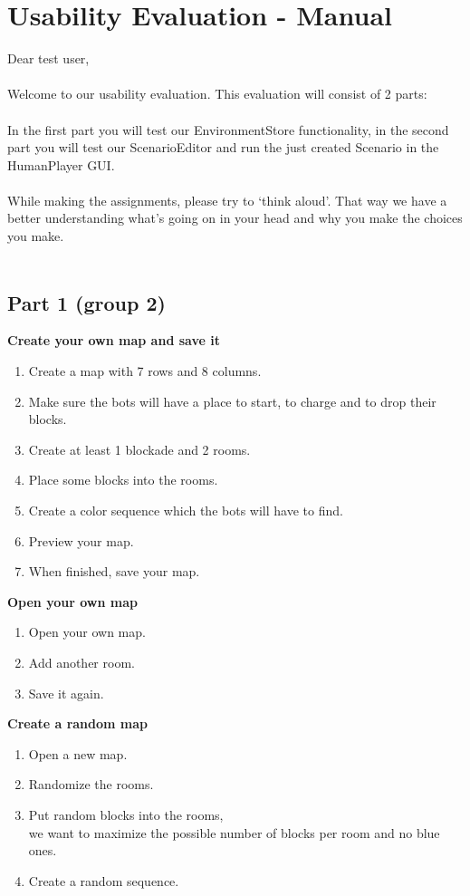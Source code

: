 \section*{Usability Evaluation - Manual}

Dear test user, \\
\\
Welcome to our usability evaluation. This evaluation will consist of 2 parts: \\
\\
In the first part you will test our EnvironmentStore functionality, in the second part you will test our ScenarioEditor and run the just created Scenario in the HumanPlayer GUI. \\
\\
While making the assignments, please try to ‘think aloud’. That way we have a better understanding what’s going on in your head and why you make the choices you make. \\
\\

\subsection*{Part 1 (group 2)}
\textbf{Create your own map and save it}
\begin{enumerate}
\item Create a map with 7 rows and 8 columns.
\item Make sure the bots will have a place to start, to charge and to drop their blocks.
\item Create at least 1 blockade and 2 rooms.
\item Place some blocks into the rooms.
\item Create a color sequence which the bots will have to find.
\item Preview your map.
\item When finished, save your map.
\end{enumerate}

\textbf{Open your own map}
\begin{enumerate}
\item Open your own map.
\item Add another room.
\item Save it again.
\end{enumerate}

\textbf{Create a random map}
\begin{enumerate}
\item Open a new map.
\item Randomize the rooms.
\item Put random blocks into the rooms,\\
we want to maximize the possible number of blocks per room and no blue ones.
\item Create a random sequence.
\end{enumerate}

